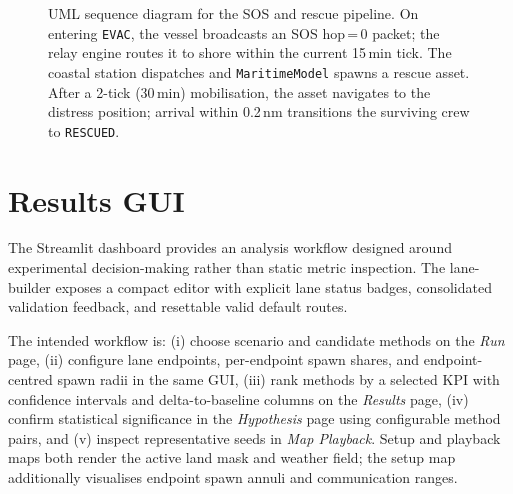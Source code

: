 \documentclass[cameraready]{Interspeech}
\begin{document}
\begin{figure}[t]
\caption{UML sequence diagram for the SOS and rescue pipeline. On entering \texttt{EVAC}, the vessel broadcasts an SOS hop\,=\,0 packet; the relay engine routes it to shore within the current 15\,min tick. The coastal station dispatches and \texttt{MaritimeModel} spawns a rescue asset. After a 2-tick (30\,min) mobilisation, the asset navigates to the distress position; arrival within 0.2\,nm transitions the surviving crew to \texttt{RESCUED}.}
\label{fig:seq}
\end{figure}

\section{Results GUI}
\label{sec:results-gui}

The Streamlit dashboard provides an analysis workflow designed around experimental decision-making rather than static metric inspection. The lane-builder exposes a compact editor with explicit lane status badges, consolidated validation feedback, and resettable valid default routes.

The intended workflow is: (i) choose scenario and candidate methods on the \textit{Run} page, (ii) configure lane endpoints, per-endpoint spawn shares, and endpoint-centred spawn radii in the same GUI, (iii) rank methods by a selected KPI with confidence intervals and delta-to-baseline columns on the \textit{Results} page, (iv) confirm statistical significance in the \textit{Hypothesis} page using configurable method pairs, and (v) inspect representative seeds in \textit{Map Playback}. Setup and playback maps both render the active land mask and weather field; the setup map additionally visualises endpoint spawn annuli and communication ranges.
\end{document}
